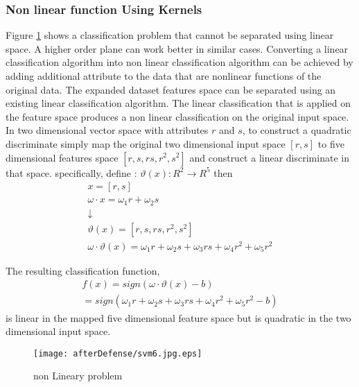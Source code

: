\subsubsection {Non linear function Using Kernels}
Figure \ref{fig:svm6} shows a classification problem that cannot be separated using linear space. A higher order plane can work better in similar cases. Converting a linear classification algorithm into non linear classification algorithm can be achieved by adding additional attribute to the data that are nonlinear functions of the original data. The expanded dataset features space can be separated using an existing linear classification algorithm.  The linear classification that is applied on the feature space produces a non linear classification on the original input space. In two dimensional vector space with attributes $r$ and $s$, to construct a quadratic  discriminate  simply map the original two dimensional input space $\left[r,s\right]$ to  five dimensional features space $\left[r,s,rs,r^2,s^2\right]$ and construct a linear discriminate in that space. specifically, define : $\vartheta(x):R^2  \rightarrow R^5$ then 
\begin{equation}
\begin{array}{l}
	x=[r,s] \\
	\omega \cdot x=\omega_1 r+ \omega_2 s \\
	\downarrow \\
	\vartheta(x)=\left[r,s,rs,r^2,s^2\right] \\
	
	 \omega \cdot \vartheta(x)= \omega_1 r+ \omega_2 s + \omega_3 rs+ \omega_4 r^2+\omega_5 r^2 
\end{array}
\label{eq:kernel}
\end{equation}  

The resulting classification function, 
\begin{equation}
\begin{array}{l}
f(x)=sign\left( \omega \cdot\vartheta(x)-b \right) \\
= sign\left( \omega_1 r+ \omega_2 s + \omega_3 rs+ \omega_4 r^2+\omega_5 r^2 -b \right) 
\end{array}
\label{eq:kern2}
\end{equation}  
is linear in the mapped five dimensional feature space but is quadratic in the two dimensional input space. 

\begin{figure}
	\centering
		\texttt{[image: afterDefense/svm6.jpg.eps]}
	\caption{non Lineary problem }
	\label{fig:svm6}
\end{figure}



